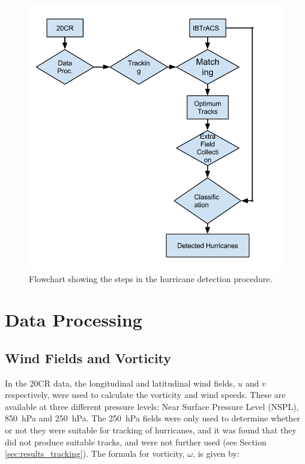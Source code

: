 \documentclass[pdftex,12pt,a4paper]{report}
\begin{document}

\begin{figure}[hb!]
    \centering
    \includegraphics[width=\textwidth]{figures/hurricane_detection_procedure}
    \caption{Flowchart showing the steps in the hurricane detection procedure.}
    \label{fig:hurricane_detection_proc}
\end{figure}

\section{Data Processing}

\subsection{Wind Fields and Vorticity}

In the 20CR data, the longitudinal and latitudinal wind fields, $u$ and $v$ respectively, were used
to calculate the vorticity and wind speeds. These are available at three different pressure levels:
Near Surface Pressure Level (NSPL), \SI{850}{hPa} and \SI{250}{hPa}. The \SI{250}{hPa} fields were
only used to determine whether or not they were suitable for tracking of hurricanes, and it was
found that they did not produce suitable tracks, and were not further used (see Section
\ref{sec:results_tracking}). The formula for vorticity, $\omega$, is given by:
\end{document}
